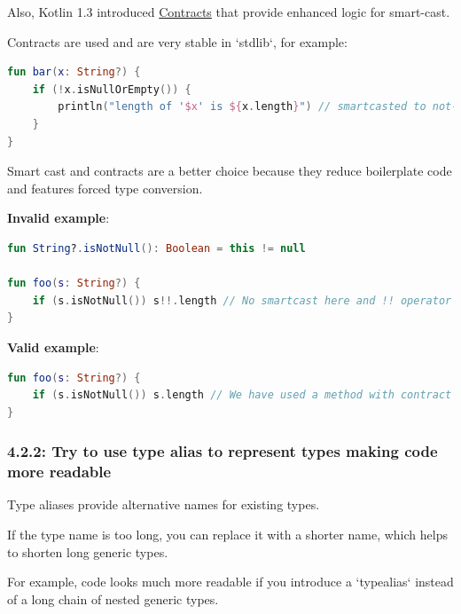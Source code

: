 {{{{Also, Kotlin 1.3 introduced \href{https://kotlinlang.org/docs/reference/whatsnew13.html#contracts}{Contracts} that provide enhanced logic for smart-cast.

Contracts are used and are very stable in `stdlib`, for example:

 



\begin{lstlisting}[language=Kotlin]
fun bar(x: String?) {
    if (!x.isNullOrEmpty()) {
        println("length of '$x' is ${x.length}") // smartcasted to not-null
    }
} 
\end{lstlisting}


Smart cast and contracts are a better choice because they reduce boilerplate code and features forced type conversion.



\textbf{Invalid example}:

\begin{lstlisting}[language=Kotlin]
fun String?.isNotNull(): Boolean = this != null

fun foo(s: String?) {
    if (s.isNotNull()) s!!.length // No smartcast here and !! operator is used
}
\end{lstlisting}


\textbf{Valid example}:

\begin{lstlisting}[language=Kotlin]
fun foo(s: String?) {
    if (s.isNotNull()) s.length // We have used a method with contract from stdlib that helped compiler to execute smart cast
}
\end{lstlisting}


\subsubsection*{\textbf{4.2.2: Try to use type alias to represent types making code more readable}}
\leavevmode\newline

\label{sec:4.2.2}



Type aliases provide alternative names for existing types.

If the type name is too long, you can replace it with a shorter name, which helps to shorten long generic types.

For example, code looks much more readable if you introduce a `typealias` instead of a long chain of nested generic types.

}}}}
